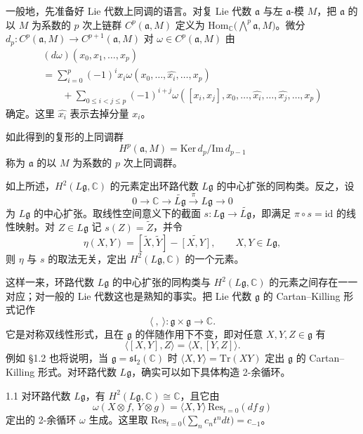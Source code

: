 一般地，先准备好 Lie 代数上同调的语言。对复 Lie 代数 $\mathfrak{a}$ 与左 $\mathfrak{a}$-模 $M$，把 $\mathfrak{a}$ 的以 $M$ 为系数的 $p$ 次上链群 $C^{p}(\mathfrak{a},M)$ 定义为 $\mathrm{Hom}_{\mathbb{C}}\bigl(\bigwedge^{p}\mathfrak{a},M\bigr)$。微分 $d_{p}\colon C^{p}(\mathfrak{a},M)\to C^{p+1}(\mathfrak{a},M)$ 对 $\omega\in C^{p}(\mathfrak{a},M)$ 由
\[
\begin{gathered}
  (d\omega)(x_{0},x_{1},\dots,x_{p}) \\
  =\sum_{i=0}^{p}(-1)^{i}x_{i}\omega(x_{0},\dots,\widehat{x_{i}},\dots,x_{p}) \\
  \qquad +\sum_{0\le i<j\le p}(-1)^{i+j}
  \omega([x_{i},x_{j}],x_{0},\dots,\widehat{x_{i}},\dots,\widehat{x_{j}},\dots,x_{p})
\end{gathered}
\]
确定。这里 $\widehat{x_{i}}$ 表示去掉分量 $x_{i}$。

如此得到的复形的上同调群
\[
  H^{p}(\mathfrak{a},M)=\mathrm{Ker}\,d_{p}/\mathrm{Im}\,d_{p-1}
\]
称为 $\mathfrak{a}$ 的以 $M$ 为系数的 $p$ 次上同调群。

如上所述，$H^{2}(L\mathfrak{g},\mathbb{C})$ 的元素定出环路代数 $L\mathfrak{g}$ 的中心扩张的同构类。反之，设
\[
  0\longrightarrow\mathbb{C}\longrightarrow\widetilde{L\mathfrak{g}}
  \xrightarrow{\ \pi\ }L\mathfrak{g}\longrightarrow 0
\]
为 $L\mathfrak{g}$ 的中心扩张。取线性空间意义下的截面 $s\colon L\mathfrak{g}\to\widetilde{L\mathfrak{g}}$，即满足 $\pi\circ s=\mathrm{id}$ 的线性映射。对 $Z\in L\mathfrak{g}$ 记 $s(Z)=\widetilde{Z}$，并令
\[
  \eta(X,Y)=[\widetilde{X},\widetilde{Y}]-\widetilde{[X,Y]},
  \qquad X,Y\in L\mathfrak{g},
\]
则 $\eta$ 与 $s$ 的取法无关，定出 $H^{2}(L\mathfrak{g},\mathbb{C})$ 的一个元素。

这样一来，环路代数 $L\mathfrak{g}$ 的中心扩张的同构类与 $H^{2}(L\mathfrak{g},\mathbb{C})$ 的元素之间存在一一对应；对一般的 Lie 代数这也是熟知的事实。把 Lie 代数 $\mathfrak{g}$ 的 Cartan--Killing 形式记作
\[
  \langle\ ,\ \rangle\colon \mathfrak{g}\times\mathfrak{g}\longrightarrow\mathbb{C}.
\]
它是对称双线性形式，且在 $\mathfrak{g}$ 的伴随作用下不变，即对任意 $X,Y,Z\in\mathfrak{g}$ 有
\[
  \langle [X,Y],Z\rangle=\langle X,[Y,Z]\rangle .
\]
例如 §1.2 也将说明，当 $\mathfrak{g}=\mathfrak{sl}_{2}(\mathbb{C})$ 时 $\langle X,Y\rangle=\mathrm{Tr}(XY)$ 定出 $\mathfrak{g}$ 的 Cartan--Killing 形式。对环路代数 $L\mathfrak{g}$，确实可以如下具体构造 2-余循环。

\begin{proposition*}{1.1}
  对环路代数 $L\mathfrak{g}$，有 $H^{2}(L\mathfrak{g},\mathbb{C})\cong\mathbb{C}$，且它由
  \[
    \omega(X\otimes f,\,Y\otimes g)=\langle X,Y\rangle\,
    \mathrm{Res}_{t=0}(df\,g)
  \]
  定出的 2-余循环 $\omega$ 生成。这里取
  $\mathrm{Res}_{t=0}\bigl(\sum_{n}c_{n}t^{n}dt\bigr)=c_{-1}$。
\end{proposition*}

